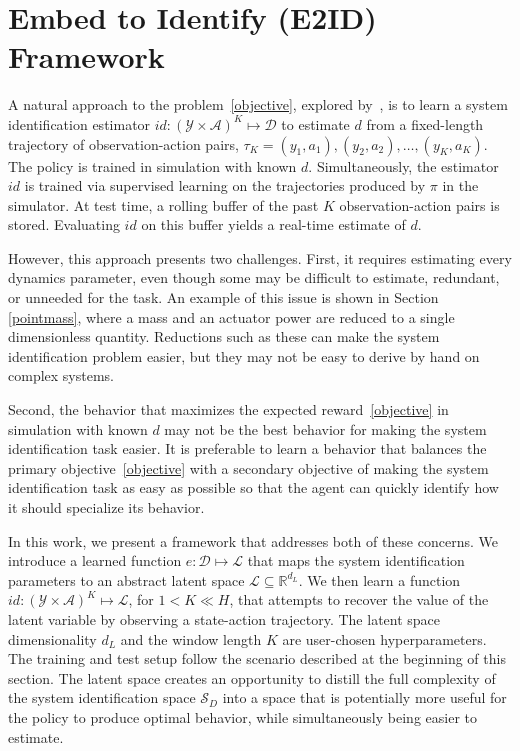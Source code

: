 \documentclass{article}
\newcommand{\R}{\mathbb{R}}
\newcommand{\cA}{\mathcal{A}}
\newcommand{\cL}{\mathcal{L}}
\newcommand{\cS}{\mathcal{S}}
\newcommand{\sysid}{dynamics}
\newcommand{\embedfn}{e}
\newcommand{\idfn}{id}
\newcommand{\latent}{\cL}
\newcommand{\obset}{\mathcal{Y}}
\newcommand{\idset}{\mathcal{D}}
\newcommand{\obvar}{y}
\newcommand{\idvar}{d}
\newcommand{\secref}[1]{Section \ref{#1}}
\begin{document}
\section{Embed to Identify (E2ID) Framework}
A natural approach to the problem~\eqref{objective}, explored by~\citet{yu-up-osi-rss17},
is to learn a system identification estimator $\idfn : (\obset \times \cA)^K \mapsto \idset$ to estimate $\idvar$
from a fixed-length trajectory of observation-action pairs, $\tau_K = (\obvar_1, a_1), (\obvar_2, a_2), \dots, (\obvar_K, a_K)$.
The policy is trained in simulation with known $\idvar$.
Simultaneously, the estimator $\idfn$ is trained via supervised learning on the trajectories produced by $\pi$ in the simulator.
At test time, a rolling buffer of the past $K$ observation-action pairs is stored.
Evaluating $\idfn$ on this buffer yields a real-time estimate of $\idvar$.

However, this approach presents two challenges.
First, it requires estimating every \sysid{} parameter,
even though some may be difficult to estimate, redundant, or unneeded for the task.
An example of this issue is shown in \secref{pointmass},
where a mass and an actuator power are reduced to a single dimensionless quantity.
Reductions such as these can make the system identification problem easier, but they may not be easy to derive by hand on complex systems.

Second, the behavior that maximizes the expected reward~\eqref{objective}
in simulation with known $\idvar$ may not be the best behavior for making the system identification task easier.
It is preferable to learn a behavior that balances the primary objective~\eqref{objective}
with a secondary objective of making the system identification task as easy as possible so that the agent can quickly identify how it should specialize its behavior.

In this work, we present a framework that addresses both of these concerns.
We introduce a learned function $\embedfn : \idset \mapsto \latent$
that maps the system identification parameters to an abstract latent space $\latent \subseteq \R^{d_L}$.
We then learn a function $\idfn : (\obset \times \cA)^K \mapsto \latent$, for $1 < K \ll H$,
that attempts to recover the value of the latent variable by observing a state-action trajectory.
The latent space dimensionality $d_L$ and the window length $K$ are user-chosen hyperparameters.
The training and test setup follow the scenario described at the beginning of this section.
The latent space creates an opportunity to distill the full complexity of the system identification space $\cS_D$ into a space that is potentially more useful for the policy to produce optimal behavior,
while simultaneously being easier to estimate.
\end{document}
